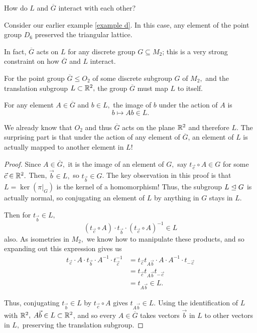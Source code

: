 \begin{qq}
How do $L$ and $\overline{G}$ interact with each other?
\end{qq}

\begin{example}
Consider our earlier example \ref{example d}. In this case, any element of the point group $D_6$ preserved the triangular lattice.
\end{example}

In fact, $\overline{G}$ acts on $L$ for any discrete group $G \subseteq M_2$; this is a very strong constraint on how $\overline{G}$ and $L$ interact.

\begin{theorem}\label{point group acts on l}
For the point group $\overline{G}\leq O_2$ of some discrete subgroup $G$ of $M_2,$ and the translation subgroup $L \subset \mathbb R^2,$ the group $\overline{G}$ must map $L$ to itself. 

For any element $A \in \overline{G}$ and $b \in L,$ the image of $b$ under the action of $A$ is
\[
b \mapsto Ab \in L.
\]



\end{theorem}

We already know that $O_2$ and thus $\overline{G}$ acts on the plane $\mathbb R^2$ and therefore $L.$ The surprising part is that under the action of any element of $\overline{G}$, an element of $L$ is actually mapped to another element in $L$!


\begin{proof}
Since $A \in \overline{G},$ it is the image of an element of $G,$ say $t_{\vec{c}} \circ A \in G$ for some $\vec{c} \in \mathbb R^2.$ Then, $\vec{b} \in L,$ so $t_{\vec{b}} \in G$. The key observation in this proof is that $L = \ker(\pi|_G)$ is the kernel of a homomorphism! Thus, the subgroup $L \trianglelefteq G$ is actually normal, so conjugating an element of $L$ by anything in $G$ stays in $L.$

Then for $t_{\vec{b}} \in L,$
\[
(t_{\vec{c}} \circ A) \cdot t_{\vec{b}} \cdot (t_{\vec{c}} \circ A)^{-1} \in L
\]
also. As isometries in $M_2,$ we know how to manipulate these products, and so expanding out this expression gives us 
\begin{align*}
    t_{\vec{c}} \cdot A \cdot t_{\vec{b}} \cdot A^{-1} \cdot t_{\vec{c}}^{-1} &= t_{\vec{c}} t_{A\vec{b}} \cdot A \cdot A^{-1} \cdot t_{-\vec{c}} \\
    &= t_{\vec{c}} t_{A\vec{b}} t_{-\vec{c}} \\
    &= t_{A\vec{b}} \in L.
\end{align*}

Thus, conjugating $t_{\vec{b}} \in L$ by $t_{\vec{c}} \circ A$ gives $t_{A\vec{b}} \in L.$ Using the identification of $L$ with $\mathbb R^2,$ $A \vec{b} \in L \subset \mathbb R^2$, and so every $A \in \overline{G}$ takes vectors $\vec{b}$ in $L$ to other vectors in $L,$ preserving the translation subgroup.
\end{proof}

